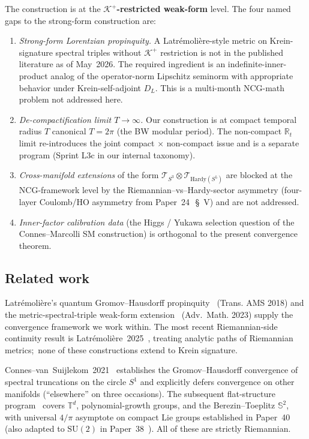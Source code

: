 \documentclass[11pt,a4paper]{article}
\theoremstyle{plain}
\theoremstyle{definition}
\newcommand{\sthree}{S^{3}}
\newcommand{\Sone}{S^{1}}
\newcommand{\Krein}{\mathcal{K}}
\newcommand{\Tcal}{\mathcal{T}}
\newcommand{\R}{\mathbb{R}}
\newcommand{\SU}{\mathrm{SU}}
\newcommand{\DL}{D_{L}}
\newcommand{\Kplus}{\Krein^{+}}
\begin{document}
The construction is at the
\textbf{$\Kplus$-restricted weak-form} level. The four named gaps to
the strong-form construction are:
\begin{enumerate}
\item[(G1)] \emph{Strong-form Lorentzian propinquity.} A
Latr\'emoli\`ere-style metric on Krein-signature spectral triples
without $\Kplus$ restriction is not in the published literature as of
May~2026. The required ingredient is an indefinite-inner-product
analog of the operator-norm Lipschitz seminorm with appropriate
behavior under Krein-self-adjoint $\DL$. This is a multi-month
NCG-math problem not addressed here.
\item[(G2)] \emph{De-compactification limit $T \to \infty$.} Our
construction is at compact temporal radius $T$ canonical
$T = 2\pi$ (the BW modular period). The non-compact $\R_{t}$ limit
re-introduces the joint compact $\times$ non-compact issue and is a
separate program (Sprint L3c in our internal taxonomy).
\item[(G3)] \emph{Cross-manifold extensions} of the form
$\Tcal_{\sthree} \otimes \Tcal_{\mathrm{Hardy}(S^{5})}$ are blocked at
the NCG-framework level by the Riemannian--vs--Hardy-sector asymmetry
(four-layer Coulomb/HO asymmetry from
Paper~24~\cite{paper24}\,\S~V) and are not addressed.
\item[(G4)] \emph{Inner-factor calibration data} (the Higgs / Yukawa
selection question of the Connes--Marcolli SM construction) is
orthogonal to the present convergence theorem.
\end{enumerate}

\subsection{Related work}\label{sec:related_work}

Latr\'emoli\`ere's quantum
Gromov--Hausdorff propinquity~\cite{latremoliere2018} (Trans. AMS 2018)
and the metric-spectral-triple weak-form
extension~\cite{latremoliere_metric_st_2017} (Adv.~Math. 2023) supply
the convergence framework we work within. The most recent
Riemannian-side continuity result is
Latr\'emoli\`ere~2025~\cite{farsi_latremoliere2025}, treating analytic
paths of Riemannian metrics;\ none of these constructions extend to
Krein signature.

Connes--van~Suijlekom~2021~\cite{connes_vs2021} establishes the
Gromov--Hausdorff convergence of spectral truncations on the circle
$\Sone$ and explicitly defers convergence on other manifolds
(``elsewhere'' on three occasions). The subsequent flat-structure
program~\cite{leimbach_vs2024,hekkelman_mcdonald2024,hekkelman_mcdonald2024b,toyota2023,farsi_latremoliere2024}
covers $\mathbb{T}^{d}$, polynomial-growth groups, and the
Berezin--Toeplitz $\mathbb{S}^{2}$, with universal $4/\pi$ asymptote on
compact Lie groups established in
Paper~40~\cite{paper40_unified} (also adapted to $\SU(2)$ in
Paper~38~\cite{paper38}). All of these are strictly Riemannian.
\end{document}
